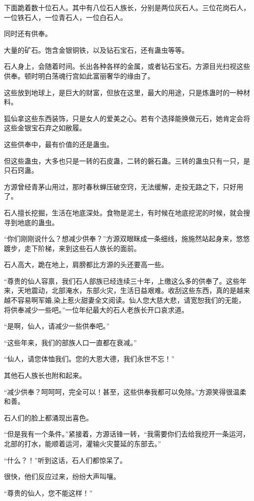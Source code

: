 \begin{this_body}
下面跪着数十位石人。其中有八位石人族长，分别是两位灰石人。三位花岗石人，一位铁石人，一位青石人，一位白石人。

同时还有供奉。

大量的矿石。饱含金银铜铁，以及钻石宝石，还有蛊虫等等。

石人身上，会随着时间。长出各种各样的金属，或者钻石宝石。方源目光扫视这些供奉。顿时明白荡魂行宫如此富丽奢华的缘由了。

这些放到地球上，是巨大的财富，但放在这里，最大的用途，只是炼蛊时的一种材料。

狐仙拿这些东西装饰，只是女人的爱美之心。若有个选择能换做元石，她肯定会将这些金银宝石弃之如敝履。

这些供奉中，最有价值的还是蛊虫。

但这些蛊虫，大多也只是一转的石皮蛊，二转的磐石蛊。三转的蛊虫只有一只，是只石窍蛊。

方源曾经青茅山用过，那时春秋蝉压破空窍，无法缓解，走投无路之下，只好用了。

石人擅长挖掘，生活在地底深处。食物是泥土，有时候在地底挖泥的时候，就会搜寻到地底的蛊虫。

“你们刚刚说什么？想减少供奉？”方源双眼眯成一条细线，施施然站起身来，悠悠踱步，走下阶梯，来到这些石人族长的面前。

石人高大，跪在地上，肩膀都比方源的头还要高一些。

“尊贵的仙人容禀，我们石人部族已经连续三十年，上缴这么多的供奉了。这些年来，天地震动，北部淹水，东部火灾，生活日益艰难。收刮这些东西，真的是越来越不容易啊军婚,染上惹火甜妻全文阅读。仙人您大慈大悲，请宽恕我们的无能，将供奉减少一些吧。”一位年纪最大的石人老族长开口哀求道。

“是啊，仙人，请减少一些供奉吧。”

“这些年来，我们的部族人口一直都在衰减。”

“仙人，请您体恤我们。您的大恩大德，我们永世不忘！”

其他石人族长也附和起来。

“减少供奉？呵呵呵，完全可以！甚至，这些供奉我都可以免除。”方源笑得很温柔和善。

石人们的脸上都涌现出喜色。

“但是我有一个条件。”紧接着，方源话锋一转，“我需要你们去给我挖开一条运河，北部的打水，能顺着运河，灌输火灾蔓延的东部去。”

“什么？！”听到这话，石人们都惊呆了。

很快，他们反应过来，纷纷大声叫嚷。

“尊贵的仙人，您不能这样！”


\end{this_body}
